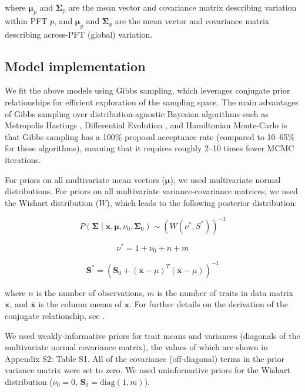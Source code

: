 \documentclass{article}
\begin{document}
where $\mathbf{\mu}_p$ and $\mathbf{\Sigma}_p$ are the mean vector and covariance matrix describing variation within PFT $p$, and $\mathbf{\mu}_g$ and $\mathbf{\Sigma}_g$ are the mean vector and covariance matrix describing across-PFT (global) variation.

\subsection{Model implementation}

We fit the above models using Gibbs sampling, which leverages conjugate prior relationships for efficient exploration of the sampling space.
The main advantages of Gibbs sampling over distribution-agnostic Bayesian algorithms such as Metropolis Hastings \citep{haario_2001_adaptive}, Differential Evolution \citep{terbraak_2008_differential}, and Hamiltonian Monte-Carlo \citep{neal_2011_hmc} is that Gibbs sampling has a 100\% proposal acceptance rate (compared to 10--65\% for these algorithms), meaning that it requires roughly 2--10 times fewer MCMC iterations.

For priors on all multivariate mean vectors ($\mathbf{\mu}$), we used multivariate normal distributions.
For priors on all multivariate variance-covariance matrices, we used the Wishart distribution ($W$), which leads to the following posterior distribution:

\begin{equation}
P(\mathbf{\Sigma} \mid
\mathbf{x}, \mathbf{\mu},
\nu_0, \mathbf{\Sigma}_0)
\sim
(W(\nu^*, S^*))^{-1}
\end{equation}

\begin{equation}
\nu^* = 1 + \nu_0 + n + m
\end{equation}

\begin{equation}
\mathbf{S^*} = (\mathbf{S}_0 + (\bar{\mathbf{x}} - \mu)^T (\bar{\mathbf{x}} - \mu))^{-1}
\end{equation}

where $n$ is the number of observations, $m$ is the number of traits in data matrix $\mathbf{x}$, and $\bar{\mathbf{x}}$ is the column means of $\mathbf{x}$.
For further details on the derivation of the conjugate relationship, see \citet[Section 3.6, "Multivariate normal with unknown mean and variance", pg. 72]{gelman_2003_bayesian}.

We used weakly-informative priors for trait means and variances (diagonals of the multivariate normal covariance matrix), the values of which are shown in Appendix S2: Table S1.
All of the covariance (off-diagonal) terms in the prior variance matrix were set to zero.
We used uninformative priors for the Wishart distribution ($\nu_0 = 0$, $\mathbf{S}_0 = \mathrm{diag}(1, m)$).
\end{document}
